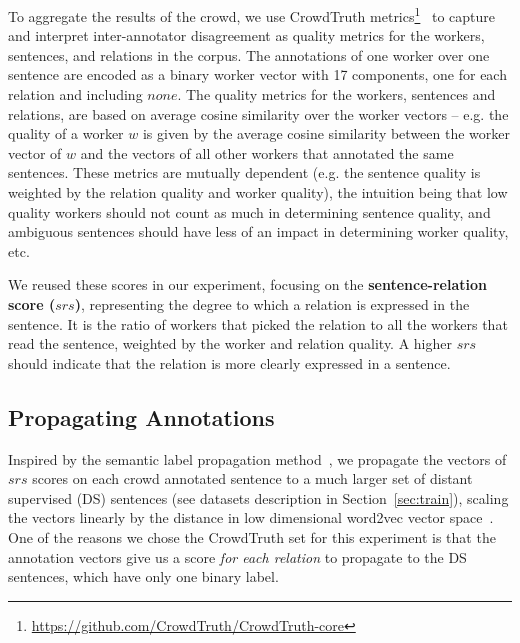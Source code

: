 To aggregate the results of the crowd, we use CrowdTruth metrics\footnote{\url{https://github.com/CrowdTruth/CrowdTruth-core}}~\cite{dumitrache2018crowdtruth} to capture and interpret inter-annotator disagreement as quality metrics for the workers, sentences, and relations in the corpus. The annotations of one worker over one sentence are encoded as a binary worker vector with 17 components, one for each relation and including $none$. The quality metrics for the workers, sentences and relations, are based on average cosine similarity over the worker vectors --  e.g. the quality of a worker $w$ is given by the average cosine similarity between the worker vector of $w$ and the vectors of all other workers that annotated the same sentences. 
These metrics are mutually dependent (e.g. the sentence quality is weighted by the relation quality and worker quality), the intuition being that low quality workers should not count as much in determining sentence quality, and ambiguous sentences should have less of an impact in determining worker quality, etc.

We reused these scores in our experiment, focusing on the \textbf{sentence-relation score ($srs$)}, representing the degree to which a relation is expressed in the sentence. It is the ratio of workers that picked the relation to all the workers that read the sentence, weighted by the worker and relation quality.  A higher $srs$ should indicate that the relation is more clearly expressed in a sentence.

\subsection{Propagating Annotations}

Inspired by the semantic label propagation method~\cite{sterckx2016knowledge}, we propagate the vectors of $srs$ scores on each crowd annotated sentence to a much larger set of distant supervised (DS) sentences (see datasets description in Section~\ref{sec:train}), scaling the vectors linearly by the distance in low dimensional word2vec vector space~\cite{mikolov2013distributed}.  One of the reasons we chose the CrowdTruth set for this experiment is that the annotation vectors give us a score \emph{for each relation} to propagate to the DS sentences, which have only one binary label.

